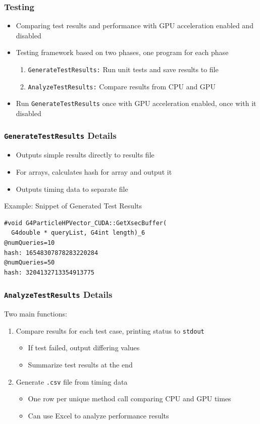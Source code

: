 \documentclass{beamer}
\begin{document}
\begin{frame}
\frametitle{Testing}
\begin{itemize}
\item Comparing test results and performance with GPU acceleration enabled and disabled
\item Testing framework based on two phases, one program for each phase
\begin{enumerate}
\item \texttt{GenerateTestResults:} Run unit tests and save results to file
\item \texttt{AnalyzeTestResults:} Compare results from CPU and GPU
\end{enumerate}
\item Run \texttt{GenerateTestResults} once with GPU acceleration enabled, once with it disabled
\end{itemize}
\end{frame}

\begin{frame}[fragile]
\frametitle{\texttt{GenerateTestResults} Details}
\begin{itemize}
\item Outputs simple results directly to results file
\item For arrays, calculates hash for array and output it
\item Outputs timing data to separate file
\end{itemize}
\begin{block}{Example: Snippet of Generated Test Results}
\begin{lstlisting}
#void G4ParticleHPVector_CUDA::GetXsecBuffer(
  G4double * queryList, G4int length)_6
@numQueries=10
hash: 16548307878283220284
@numQueries=50
hash: 3204132713354913775
\end{lstlisting}
\end{block}
\end{frame}

\begin{frame}
\frametitle{\texttt{AnalyzeTestResults} Details}
Two main functions:
\begin{enumerate}
\item Compare results for each test case, printing status to \texttt{stdout}
\begin{itemize}
\item If test failed, output differing values
\item Summarize test results at the end
\end{itemize}
\item Generate \texttt{.csv} file from timing data
\begin{itemize}
\item One row per unique method call comparing CPU and GPU times
\item Can use Excel to analyze performance results
\end{itemize}
\end{enumerate}
\end{frame}
\end{document}
